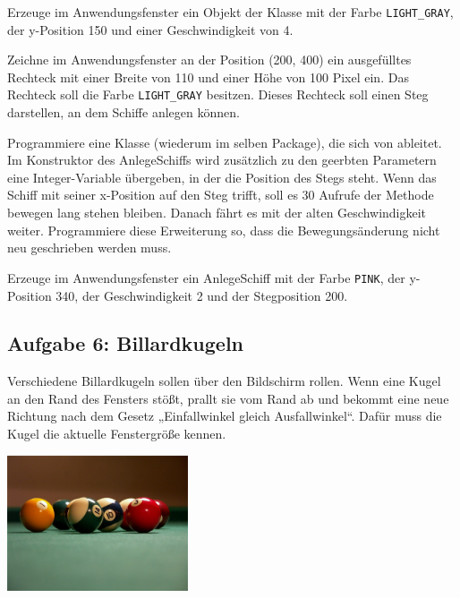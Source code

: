 \begin{compactenum}[a)]
Erzeuge im Anwendungsfenster ein Objekt der Klasse  mit
der Farbe \verb|LIGHT_GRAY|, der y-Position 150 und einer Geschwindigkeit von 4.

\item Zeichne im Anwendungsfenster an der Position (200, 400) ein ausgefülltes
Rechteck mit einer Breite von 110 und einer Höhe von 100 Pixel ein. Das
Rechteck soll die Farbe \verb|LIGHT_GRAY| besitzen. Dieses Rechteck soll einen
Steg darstellen, an dem Schiffe anlegen können.

\item Programmiere eine Klasse  (wiederum im selben
Package), die sich von  ableitet. Im
Konstruktor des AnlegeSchiffs wird zusätzlich zu den geerbten Parametern eine
Integer-Variable übergeben, in der die Position des Stegs steht. Wenn das
Schiff mit seiner x-Position auf den Steg trifft, soll es 30 Aufrufe der
Methode bewegen lang stehen bleiben. Danach fährt es mit der alten
Geschwindigkeit weiter. Programmiere diese Erweiterung so, dass die
Bewegungsänderung nicht neu geschrieben werden muss.

Erzeuge im Anwendungsfenster ein AnlegeSchiff mit der Farbe \verb|PINK|, der
y-Position 340, der Geschwindigkeit 2 und der Stegposition 200.
\end{compactenum}


\subsection{Aufgabe 6: Billardkugeln}

Verschiedene Billardkugeln sollen über den Bildschirm rollen. Wenn eine Kugel
an den Rand des Fensters stößt, prallt sie vom Rand ab und bekommt eine neue
Richtung nach dem Gesetz „Einfallwinkel gleich Ausfallwinkel“. Dafür muss die
Kugel die aktuelle Fenstergröße kennen.

\begin{center}
\includegraphics[width=0.4\textwidth]{./inf/SEKII/16_Java_Vererbung/Billiards_balls.jpg}
\end{center}

